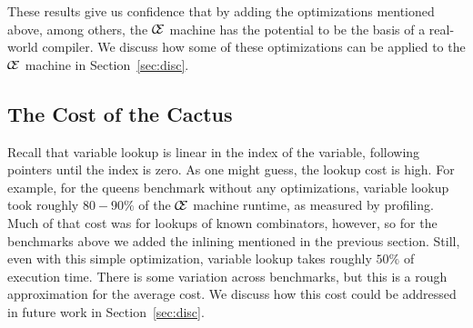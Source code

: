 These results give us confidence that by adding the optimizations mentioned
above, among others, the $\mathcal{\mathcal{C} \mskip -4mu \mathcal{E}}$ machine has the potential to be the
basis of a real-world compiler. We discuss how some of these optimizations can
be applied to the $\mathcal{\mathcal{C} \mskip -4mu \mathcal{E}}$ machine in Section~\ref{sec:disc}.

\subsection{The Cost of the Cactus}

Recall that variable lookup is linear in the index of the variable, following
pointers until the index is zero. As one might guess, the lookup cost is high.
For example, for the queens benchmark without any optimizations, variable lookup
took roughly $80-90\%$ of the $\mathcal{\mathcal{C} \mskip -4mu \mathcal{E}}$ machine runtime, as measured
by profiling. Much of that cost was for lookups of known combinators, however,
so for the benchmarks above we added the inlining mentioned in the previous
section. Still, even with this simple optimization, variable lookup takes
roughly $50\%$ of execution time. There is some variation across benchmarks, but
this is a rough approximation for the average cost. We discuss how this cost
could be addressed in future work in Section~\ref{sec:disc}.


